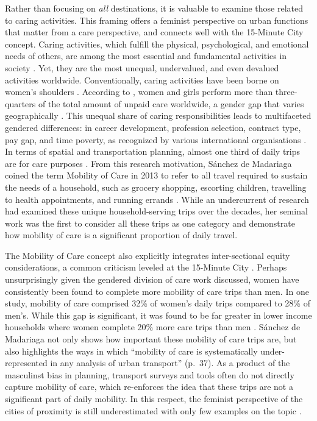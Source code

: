 \documentclass[
  authoryear,
  preprint,
  3p]{elsarticle}
\begin{document}
Rather than focusing on \emph{all} destinations, it is valuable to
examine those related to caring activities. This framing offers a
feminist perspective on urban functions that matter from a care
perspective, and connects well with the 15-Minute City concept. Caring
activities, which fulfill the physical, psychological, and emotional
needs of others, are among the most essential and fundamental activities
in society \citep{ilo_care_2018}. Yet, they are the most unequal,
undervalued, and even devalued activities worldwide. Conventionally,
caring activities have been borne on women's shoulders
\citep{haydenGrandDomesticRevolution1982, hochschild_second_2012}.
According to \citet{ilo_care_2018}, women and girls perform more than
three-quarters of the total amount of unpaid care worldwide, a gender
gap that varies geographically \citep{RN5}. This unequal share of caring
responsibilities leads to multifaceted gendered differences: in career
development, profession selection, contract type, pay gap, and time
poverty, as recognized by various international organisations
\citep{EIGE2016, ilo_care_2018}. In terms of spatial and transportation
planning, almost one third of daily trips are for care purposes
\citep{sanchezdemadariagaMobilityCareIntroducing2013, sanchezdemadariagaMeasuringMobilitiesCare2019, ravensbergen2023exploratory}.
From this research motivation, Sánchez de Madariaga coined the term
Mobility of Care in 2013 to refer to all travel required to sustain the
needs of a household, such as grocery shopping, escorting children,
travelling to health appointments, and running errands
\citep{sanchezdemadariagaMobilityCareIntroducing2013}. While an
undercurrent of research had examined these unique household-serving
trips over the decades, her seminal work was the first to consider all
these trips as one category and demonstrate how mobility of care is a
significant proportion of daily travel.

The Mobility of Care concept also explicitly integrates inter-sectional
equity considerations, a common criticism leveled at the 15-Minute City
\citep{guzmanProximityEnoughCritical2024}. Perhaps unsurprisingly given
the gendered division of care work discussed, women have consistently
been found to complete more mobility of care trips than men. In one
study, mobility of care comprised 32\% of women's daily trips compared
to 28\% of men's. While this gap is significant, it was found to be far
greater in lower income households where women complete 20\% more care
trips than men \citep{ravensbergen2023exploratory}. Sánchez de Madariaga
not only shows how important these mobility of care trips are, but also
highlights the ways in which ``mobility of care is systematically
under-represented in any analysis of urban transport'' (p.~37). As a
product of the masculinst bias in planning, transport surveys and tools
often do not directly capture mobility of care, which re-enforces the
idea that these trips are not a significant part of daily mobility. In
this respect, the feminist perspective of the cities of proximity is
still underestimated with only few examples on the topic
\citep{gil_sola_choose_2022, macintyre_her_2022}.
\end{document}
